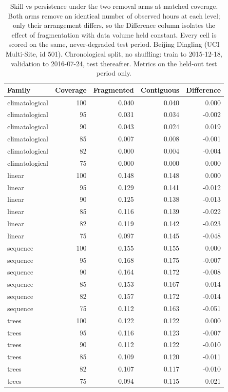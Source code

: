\begin{table}[htbp]
\caption{Skill vs persistence under the two removal arms at matched coverage. Both arms remove an identical number of observed hours at each level; only their arrangement differs, so the Difference column isolates the effect of fragmentation with data volume held constant. Every cell is scored on the same, never-degraded test period. Beijing Dingling (UCI Multi-Site, id 501). Chronological split, no shuffling: train to 2015-12-18, validation to 2016-07-24, test thereafter. Metrics on the held-out test period only.}
\label{tab:ablation_arm_gap}
\begin{tabular}{lrrrr}
\toprule
Family & Coverage & Fragmented & Contiguous & Difference \\
\midrule
climatological & 100 & 0.040 & 0.040 & 0.000 \\
climatological & 95 & 0.031 & 0.034 & -0.002 \\
climatological & 90 & 0.043 & 0.024 & 0.019 \\
climatological & 85 & 0.007 & 0.008 & -0.001 \\
climatological & 82 & 0.000 & 0.004 & -0.004 \\
climatological & 75 & 0.000 & 0.000 & 0.000 \\
linear & 100 & 0.148 & 0.148 & 0.000 \\
linear & 95 & 0.129 & 0.141 & -0.012 \\
linear & 90 & 0.125 & 0.138 & -0.013 \\
linear & 85 & 0.116 & 0.139 & -0.022 \\
linear & 82 & 0.119 & 0.142 & -0.023 \\
linear & 75 & 0.097 & 0.145 & -0.048 \\
sequence & 100 & 0.155 & 0.155 & 0.000 \\
sequence & 95 & 0.168 & 0.175 & -0.007 \\
sequence & 90 & 0.164 & 0.172 & -0.008 \\
sequence & 85 & 0.153 & 0.167 & -0.014 \\
sequence & 82 & 0.157 & 0.172 & -0.014 \\
sequence & 75 & 0.112 & 0.163 & -0.051 \\
trees & 100 & 0.122 & 0.122 & 0.000 \\
trees & 95 & 0.116 & 0.123 & -0.007 \\
trees & 90 & 0.112 & 0.122 & -0.010 \\
trees & 85 & 0.109 & 0.120 & -0.011 \\
trees & 82 & 0.107 & 0.117 & -0.010 \\
trees & 75 & 0.094 & 0.115 & -0.021 \\
\bottomrule
\end{tabular}
\end{table}
